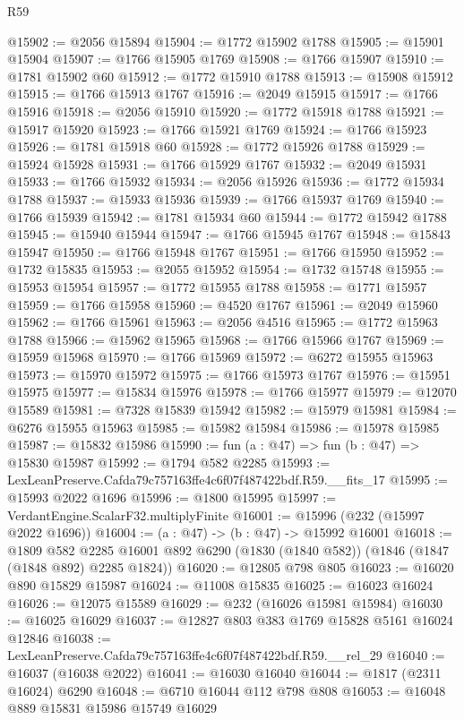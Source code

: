 \begin{lexlean}{R59}
\begin{coremodule}
@15902 := @2056 @15894
@15904 := @1772 @15902 @1788
@15905 := @15901 @15904
@15907 := @1766 @15905 @1769
@15908 := @1766 @15907
@15910 := @1781 @15902 @60
@15912 := @1772 @15910 @1788
@15913 := @15908 @15912
@15915 := @1766 @15913 @1767
@15916 := @2049 @15915
@15917 := @1766 @15916
@15918 := @2056 @15910
@15920 := @1772 @15918 @1788
@15921 := @15917 @15920
@15923 := @1766 @15921 @1769
@15924 := @1766 @15923
@15926 := @1781 @15918 @60
@15928 := @1772 @15926 @1788
@15929 := @15924 @15928
@15931 := @1766 @15929 @1767
@15932 := @2049 @15931
@15933 := @1766 @15932
@15934 := @2056 @15926
@15936 := @1772 @15934 @1788
@15937 := @15933 @15936
@15939 := @1766 @15937 @1769
@15940 := @1766 @15939
@15942 := @1781 @15934 @60
@15944 := @1772 @15942 @1788
@15945 := @15940 @15944
@15947 := @1766 @15945 @1767
@15948 := @15843 @15947
@15950 := @1766 @15948 @1767
@15951 := @1766 @15950
@15952 := @1732 @15835
@15953 := @2055 @15952
@15954 := @1732 @15748
@15955 := @15953 @15954
@15957 := @1772 @15955 @1788
@15958 := @1771 @15957
@15959 := @1766 @15958
@15960 := @4520 @1767
@15961 := @2049 @15960
@15962 := @1766 @15961
@15963 := @2056 @4516
@15965 := @1772 @15963 @1788
@15966 := @15962 @15965
@15968 := @1766 @15966 @1767
@15969 := @15959 @15968
@15970 := @1766 @15969
@15972 := @6272 @15955 @15963
@15973 := @15970 @15972
@15975 := @1766 @15973 @1767
@15976 := @15951 @15975
@15977 := @15834 @15976
@15978 := @1766 @15977
@15979 := @12070 @15589
@15981 := @7328 @15839 @15942
@15982 := @15979 @15981
@15984 := @6276 @15955 @15963
@15985 := @15982 @15984
@15986 := @15978 @15985
@15987 := @15832 @15986
@15990 := fun (a : @47) => fun (b : @47) => @15830 @15987
@15992 := @1794 @582 @2285
@15993 := LexLeanPreserve.Cafda79c757163ffe4c6f07f487422bdf.R59.__fits_17
@15995 := @15993 @2022 @1696
@15996 := @1800 @15995
@15997 := VerdantEngine.ScalarF32.multiplyFinite
@16001 := @15996 (@232 (@15997 @2022 @1696))
@16004 := (a : @47) -> (b : @47) -> @15992 @16001
@16018 := @1809
    @582
    @2285
    @16001
    @892
    @6290
    (@1830 (@1840 @582))
    (@1846 (@1847 (@1848 @892) @2285 @1824))
@16020 := @12805 @798 @805
@16023 := @16020 @890 @15829 @15987
@16024 := @11008 @15835
@16025 := @16023 @16024
@16026 := @12075 @15589
@16029 := @232 (@16026 @15981 @15984)
@16030 := @16025 @16029
@16037 := @12827 @803 @383 @1769 @15828 @5161 @16024 @12846
@16038 := LexLeanPreserve.Cafda79c757163ffe4c6f07f487422bdf.R59.__rel_29
@16040 := @16037 (@16038 @2022)
@16041 := @16030 @16040
@16044 := @1817 (@2311 @16024) @6290
@16048 := @6710 @16044 @112 @798 @808
@16053 := @16048 @889 @15831 @15986 @15749 @16029

\end{coremodule}
\end{lexlean}
